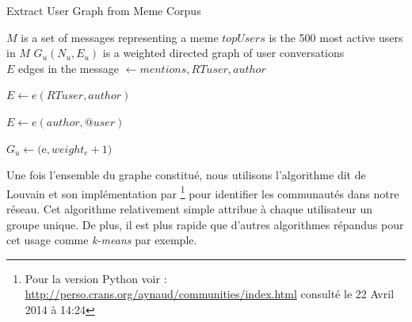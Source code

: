     \begin{algorithm}[h]
        \caption{Extract User Graph from Meme Corpus}
        \label{algo:meme-user-graph}
        \begin{algorithmic}
            \Require $M$ is a set of messages representing a meme
            \State $topUsers$ is the 500 most active users in $M$
            \State $G_u(N_u,E_u)$ is a weighted directed graph of user conversations
            \\
                    \State $E$ edges in the message
                    \State {}  $ \gets mentions, RTuser, author$
                    

                            \State $E \gets e(RTuser, author)$    
                        \EndIf

                            \State $E \gets e(author, @user)$    
                        \EndFor
                        
                            \State $G_u \gets ($e$,weight_e+1)$
                        \EndFor

                    \EndIf

                \EndFor
            \EndFunction
        \end{algorithmic}
    \end{algorithm}

    Une fois l{\textquoteright}ensemble du graphe constitué, nous utilisons l{\textquoteright}algorithme dit de Louvain et son implémentation par \cite{Blondel2008}\footnote{Pour la version Python voir : \url{http://perso.crans.org/aynaud/communities/index.html} consulté le 22 Avril 2014 à 14:24} pour identifier les communautés dans notre réseau. Cet algorithme relativement simple attribue à chaque utilisateur un groupe unique. De plus, il est plus rapide que d'autres algorithmes répandus pour cet usage comme \textit{k-means} par exemple.

